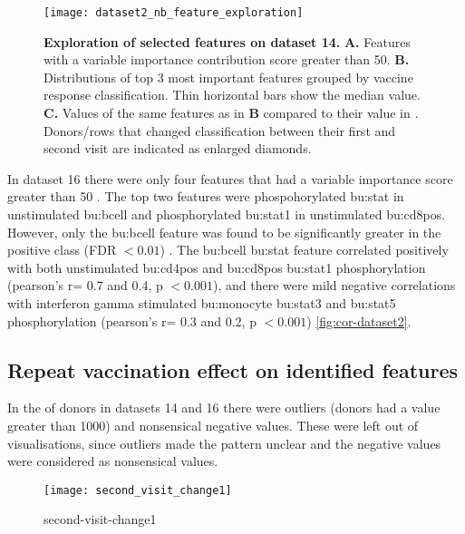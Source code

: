 \begin{figure}[htpb]
    \centering
    \texttt{[image: dataset2\_nb\_feature\_exploration]}
    \caption{
        \textbf{Exploration of selected features on dataset 14.}
        \textbf{A.} Features with a variable importance contribution score greater than 50.
        \textbf{B.} Distributions of top 3 most important features grouped by vaccine response classification.
        Thin horizontal bars show the median value.
        \textbf{C.} Values of the same features as in \textbf{B} compared to their value in \secondvis.
        Donors/rows that changed classification between their first and second visit are indicated as enlarged diamonds.
    }\label{fig:dataset2-nb-feature-exploration}
\end{figure}

In dataset 16 there were only four features that had a variable importance score greater than 50 .
The top two features were phospohorylated \gls{bu:stat} in unstimulated \gls{bu:bcell} and phosphorylated \gls{bu:stat}1 in unstimulated \gls{bu:cd8pos}.
However, only the \gls{bu:bcell} feature was found to be significantly greater in the positive class (FDR \(< 0.01\)) .
The \gls{bu:bcell} \gls{bu:stat} feature correlated positively with both unstimulated \gls{bu:cd4pos} and \gls{bu:cd8pos} \gls{bu:stat}1 phosphorylation (pearson's r= 0.7 and 0.4, p \(< 0.001\)), and there were mild negative correlations with interferon gamma stimulated \gls{bu:monocyte} \gls{bu:stat}3 and \gls{bu:stat}5 phosphorylation (pearson's r= 0.3 and 0.2, p \(< 0.001\)) \autoref{fig:cor-dataset2}.

\subsection{Repeat vaccination effect on identified features}

In the \secondvis of donors in datasets 14 and 16 there were outliers (donors had a value greater than 1000) and nonsensical negative values.
These were left out of visualisations, since outliers made the pattern unclear and the negative values were considered as nonsensical values.

\begin{figure}[htpb]
    \centering
    \texttt{[image: second\_visit\_change1]}
    \caption{second-visit-change1}
    \label{fig:second-visit-change1}
\end{figure}

